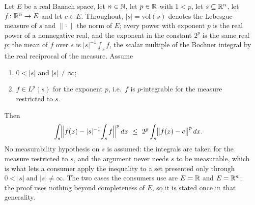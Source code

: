 \begin{helper}
Let $E$ be a real Banach space, let $n\in\mathbb{N}$, let $p\in\mathbb{R}$ with $1<p$, let
$s\subseteq\mathbb{R}^n$, let $f\colon\mathbb{R}^n\to E$ and let $c\in E$.  Throughout,
$|s|=\mathrm{vol}(s)$ denotes the Lebesgue measure of $s$ and $\|\cdot\|$ the
norm of $E$; every power with exponent $p$ is the real power of a nonnegative
real, and the exponent in the constant $2^p$ is the same real $p$; the mean of
$f$ over $s$ is $|s|^{-1}\!\int_sf$, the scalar multiple of the Bochner
integral by the real reciprocal of the measure.  Assume
\begin{enumerate}
\item[(H1)] $0<|s|$ and $|s|\neq\infty$;
\item[(H2)] $f\in L^p(s)$ for the exponent $p$, i.e.\ $f$ is $p$-integrable
  for the measure restricted to $s$.
\end{enumerate}
Then
\[
\int_s\Bigl\|f(x)-|s|^{-1}\!\int_sf\Bigr\|^p\,dx
\ \le\ 2^p\int_s\bigl\|f(x)-c\bigr\|^p\,dx .
\]
No measurability hypothesis on $s$ is assumed: the integrals are taken for the
measure restricted to $s$, and the argument never needs $s$ to be measurable,
which is what lets a consumer apply the inequality to a set presented only
through $0<|s|$ and $|s|\neq\infty$.  The two cases the consumers use are
$E=\mathbb{R}$ and $E=\mathbb{R}^n$; the proof uses nothing beyond completeness of $E$, so it
is stated once in that generality.
\end{helper}
